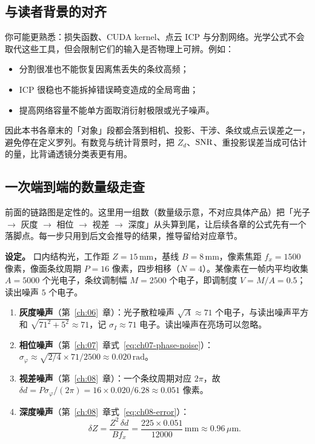 \subsection{与读者背景的对齐}

你可能更熟悉：损失函数、CUDA kernel、点云 ICP 与分割网络。光学公式不会取代这些工具，但会限制它们的输入是否物理上可辨。例如：
\begin{itemize}
  \item 分割很准也不能恢复因离焦丢失的条纹高频；
  \item ICP 很稳也不能拆掉错误畸变造成的全局弯曲；
  \item 提高网络容量不能单方面取消衍射极限或光子噪声。
\end{itemize}
因此本书各章末的「对象」段都会落到相机、投影、干涉、条纹或点云误差之一，避免停在定义罗列。有数竞与统计背景时，把 $Z_d$、$\mathrm{SNR}$、重投影误差当成可估计的量，比背诵透镜分类表更有用。

\subsection{一次端到端的数量级走查}

前面的链路图是定性的。这里用一组数（数量级示意，不对应具体产品）把「光子 $\to$ 灰度 $\to$ 相位 $\to$ 视差 $\to$ 深度」从头算到尾，让后续各章的公式先有一个落脚点。每一步只用到后文会推导的结果，推导留给对应章节。

\textbf{设定。} 口内结构光，工作距 $Z=15\,\mathrm{mm}$，基线 $B=8\,\mathrm{mm}$，像素焦距 $f_x=1500$ 像素，像面条纹周期 $P=16$ 像素，四步相移（$N=4$）。某像素在一帧内平均收集 $A=5000$ 个光电子，条纹调制幅 $M=2500$ 个电子，即调制度 $V=M/A=0.5$；读出噪声 $5$ 个电子。

\begin{enumerate}
  \item \textbf{灰度噪声}（第~\ref{ch:06}~章）：光子散粒噪声 $\sqrt{A}\approx71$ 个电子，与读出噪声平方和 $\sqrt{71^2+5^2}\approx71$，记 $\sigma_I\approx71$ 电子。读出噪声在亮场可以忽略。
  \item \textbf{相位噪声}（第~\ref{ch:07}~章式~\eqref{eq:ch07-phase-noise}）：$\sigma_\varphi\approx\sqrt{2/4}\times71/2500\approx0.020\,\mathrm{rad}$。
  \item \textbf{视差噪声}（第~\ref{ch:08}~章）：一个条纹周期对应 $2\pi$，故 $\delta d=P\sigma_\varphi/(2\pi)=16\times0.020/6.28\approx0.051$ 像素。
  \item \textbf{深度噪声}（第~\ref{ch:08}~章式~\eqref{eq:ch08-error}）：
  \[\delta Z=\frac{Z^2\,\delta d}{Bf_x}=\frac{225\times0.051}{12000}\,\mathrm{mm}\approx0.96\,\mu\mathrm{m}.\]
\end{enumerate}

